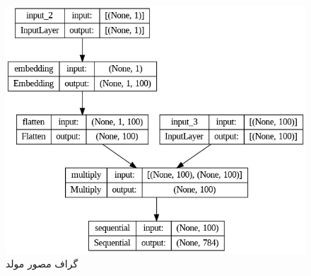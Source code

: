 \documentclass{article}
\begin{document}
\begin{figure}[!h]
    \centering\includegraphics[scale=.55]{./gen-1}
    \caption{گراف مصور مولد}\label{fig.31}
\end{figure}
\end{document}
